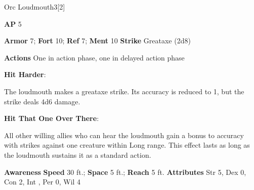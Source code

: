 \begin{monsection}{Orc Loudmouth}{3}[2]
\vspace{-1em}\vspace{-1em}
\begin{spellcontent}
\begin{spelltargetinginfo}
{\textbf{AP} 5}

\pari \textbf{Armor} 7;
\textbf{Fort} 10;
\textbf{Ref} 7;
\textbf{Ment} 10
\pari \textbf{Strike} Greataxe  (2d8)


\pari \textbf{Actions} One in action phase, one in delayed action phase
\end{spelltargetinginfo}


\begin{spelleffects}

\pari
\textbf{Hit Harder}:

The loudmouth makes a greataxe strike.
Its accuracy is reduced to 1, but the strike deals 4d6 damage.




\vspace{0.5em}
\pari
\textbf{Hit That One Over There}:

All other willing allies who can hear the loudmouth gain a  bonus to accuracy with strikes against one creature within Long range.
This effect lasts as long as the loudmouth sustains it as a standard action.




\end{spelleffects}

\end{spellcontent}

\begin{monsterfooter}
\pari \textbf{Awareness} 
\pari \textbf{Speed} 30 ft.;
\textbf{Space} 5 ft.;
\textbf{Reach} 5 ft.
\pari \textbf{Attributes}
Str 5,
Dex 0,
Con 2,
Int ,
Per 0,
Wil 4
\end{monsterfooter}
\end{monsection}



